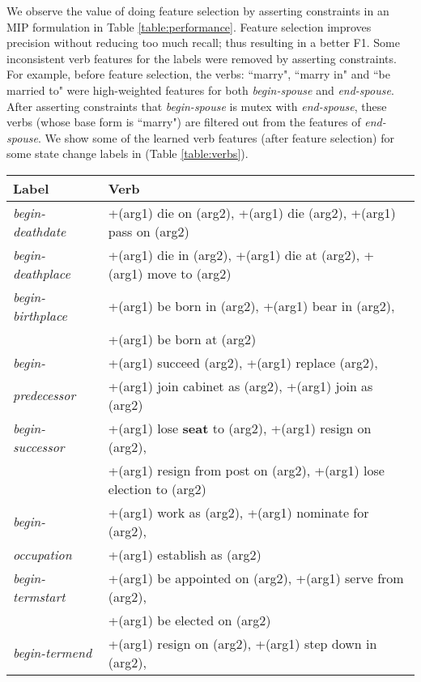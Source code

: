 We observe the value of doing feature selection by asserting constraints in an MIP formulation in Table \ref{table:performance}. Feature selection improves precision without reducing too much recall; thus resulting in a better F1. Some inconsistent verb features for the labels were removed by asserting constraints. For example, before feature selection, the verbs: ``marry", ``marry in" and ``be married to" were high-weighted features for both \textit{begin-spouse} and \textit{end-spouse}. After asserting constraints that \textit{begin-spouse} is mutex with \textit{end-spouse}, these verbs (whose base form is ``marry") are filtered out from the features of \textit{end-spouse}. We show some of the learned verb features (after feature selection) for some state change labels in (Table \ref{table:verbs}).
\begin{table}
\begin{scriptsize}
\begin{center}
\begin{tabular}{|l|l|}
\hline
Label & Verb \\
\hline
\textit{begin-deathdate} &+(arg1) die on (arg2), +(arg1) die (arg2), +(arg1) pass on (arg2) \\
\hline
\textit{begin-deathplace} &+(arg1) die in (arg2), +(arg1) die at (arg2), +(arg1) move to (arg2) \\
\hline
\textit{begin-birthplace} &+(arg1) be born in (arg2), +(arg1) bear in (arg2), \\
&+(arg1) be born at (arg2) \\
\hline
\textit{begin-} &+(arg1) succeed (arg2), +(arg1) replace (arg2), \\
\textit{predecessor}& +(arg1) join cabinet as (arg2), +(arg1) join as (arg2) \\
\hline
\textit{begin-successor} &+(arg1) lose \textbf{seat} to (arg2), +(arg1) resign on (arg2), \\
& +(arg1) resign from post on (arg2), +(arg1) lose election to (arg2) \\
\hline
\textit{begin-} &+(arg1) work as (arg2), +(arg1) nominate for (arg2), \\
\textit{occupation}& +(arg1) establish as (arg2) \\
\hline
\textit{begin-termstart} &+(arg1) be appointed on (arg2), +(arg1) serve from (arg2), \\
& +(arg1) be elected on (arg2) \\
\hline
\textit{begin-termend} &+(arg1) resign on (arg2), +(arg1) step down in (arg2), \\

\end{tabular}
\end{center}
\end{scriptsize}
\end{table}
